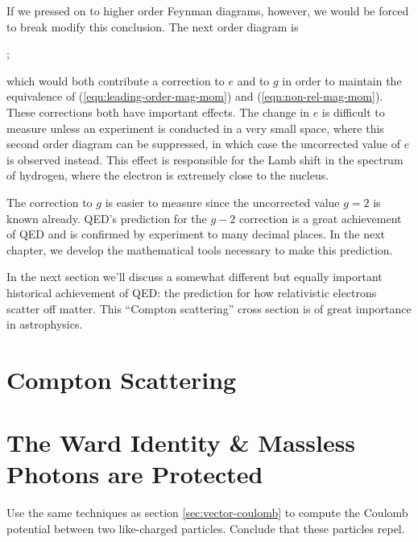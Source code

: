 If we pressed on to higher order Feynman diagrams, however, we would be forced to break modify this conclusion. The next order diagram is
\begin{center}
  ;
\end{center}
which would both contribute a correction to $e$ and to $g$ in order to maintain the equivalence of (\ref{eqn:leading-order-mag-mom}) and (\ref{eqn:non-rel-mag-mom}). These corrections both have important effects. The change in $e$ is difficult to measure unless an experiment is conducted in a very small space, where this second order diagram can be suppressed, in which case the uncorrected value of $e$ is observed instead. This effect is responsible for the Lamb shift in the spectrum of hydrogen, where the electron is extremely close to the nucleus.

The correction to $g$ is easier to measure since the uncorrected value $g=2$ is known already. QED's prediction for the $g-2$ correction is a great achievement of QED and is confirmed by experiment to many decimal places. In the next chapter, we develop the mathematical tools necessary to make this prediction.

In the next section we'll discuss a somewhat different but equally important historical achievement of QED: the prediction for how relativistic electrons scatter off matter. This ``Compton scattering'' cross section is of great importance in astrophysics.

\section{Compton Scattering}

\section{The Ward Identity \& Massless Photons are Protected}

\begin{problem}
  Use the same techniques as section \ref{sec:vector-coulomb} to compute the Coulomb potential between two like-charged particles. Conclude that these particles repel.
\end{problem}
